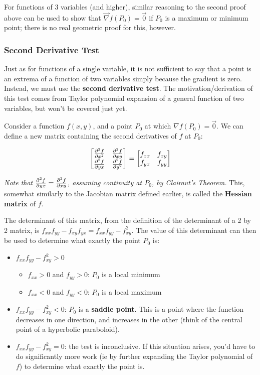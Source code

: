 \documentclass[12pt]{article}
\begin{document}
{For functions of 3 variables (and higher), similar reasoning to the second proof above can be used to show that $\vec{\nabla}f(P_0) = \vec{0}$ if $P_0$ is a maximum or minimum point; there is no real geometric proof for this, however.


\subsubsection{Second Derivative Test} \label{sec:second-derivative-test}

Just as for functions of a single variable, it is not sufficient to say that a point is an extrema of a function of two variables simply because the gradient is zero. Instead, we must use the \textbf{second derivative test}. The motivation/derivation of this test comes from Taylor polynomial expansion of a general function of two variables, but won't be covered just yet.

Consider a function $f(x,y)$, and a point $P_0$ at which $\nabla f(P_0) = \vec{0}$. We can define a new matrix containing the second derivatives of $f$ at $P_0$:

\begin{align*}
    \begin{bmatrix}
        \frac{\partial ^2f}{\partial x^2} & \frac{\partial ^2f}{\partial xy}\\
        \frac{\partial ^2f}{\partial yx} & \frac{\partial ^2f}{\partial y^2}
    \end{bmatrix} = \begin{bmatrix}
        f_{xx} & f_{xy}\\
        f_{yx} & f_{yy}
    \end{bmatrix}
\end{align*}

\textit{Note that $\frac{\partial ^2f}{\partial yx} = \frac{\partial ^2f}{\partial xy}$, assuming continuity at $P_0$, by Clairaut's Theorem.} This, somewhat similarly to the Jacobian matrix defined earlier, is called the \textbf{Hessian matrix} of $f$.

The determinant of this matrix, from the definition of the determinant of a 2 by 2 matrix, is $f_{xx}f_{yy} - f_{xy}f_{yx} = f_{xx}f_{yy} - f_{xy}^2$. The value of this determinant can then be used to determine what exactly the point $P_0$ is:

\begin{itemize}
    \item $f_{xx}f_{yy} - f_{xy}^2>0$
    \begin{itemize}
        \item $f_{xx} > 0$ and $f_{yy} > 0$: $P_0$ is a local minimum
        \item $f_{xx} < 0$ and $f_{yy} < 0$: $P_0$ is a local maximum
    \end{itemize}
    \item $f_{xx}f_{yy} - f_{xy}^2<0$: $P_0$ is a \textbf{saddle point}. This is a point where the function decreases in one direction, and increases in the other (think of the central point of a hyperbolic paraboloid). 
    \item $f_{xx}f_{yy} - f_{xy}^2=0$: the test is inconclusive. If this situation arises, you'd have to do significantly more work (ie by further expanding the Taylor polynomial of $f$) to determine what exactly the point is.
\end{itemize}

}
\end{document}
